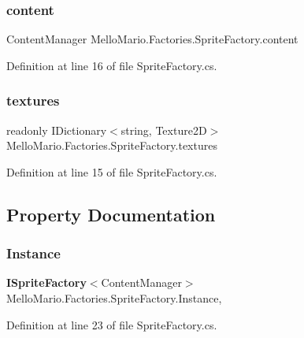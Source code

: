 \subsubsection{content}
{\footnotesize\ttfamily Content\+Manager Mello\+Mario.\+Factories.\+Sprite\+Factory.\+content\hspace{0.3cm}{\ttfamily [private]}}



Definition at line 16 of file Sprite\+Factory.\+cs.

\mbox{\label{classMelloMario_1_1Factories_1_1SpriteFactory_aeaecb17b7daf7a8af287c5ebebe2c826}} 
\subsubsection{textures}
{\footnotesize\ttfamily readonly I\+Dictionary$<$string, Texture2D$>$ Mello\+Mario.\+Factories.\+Sprite\+Factory.\+textures\hspace{0.3cm}{\ttfamily [private]}}



Definition at line 15 of file Sprite\+Factory.\+cs.



\subsection{Property Documentation}
\mbox{\label{classMelloMario_1_1Factories_1_1SpriteFactory_aa0052a5d908078ac2ef4b93dfb488c50}} 
\subsubsection{Instance}
{\footnotesize\ttfamily \textbf{ I\+Sprite\+Factory}$<$Content\+Manager$>$ Mello\+Mario.\+Factories.\+Sprite\+Factory.\+Instance\hspace{0.3cm}{\ttfamily [static]}, {\ttfamily [get]}}



Definition at line 23 of file Sprite\+Factory.\+cs.



